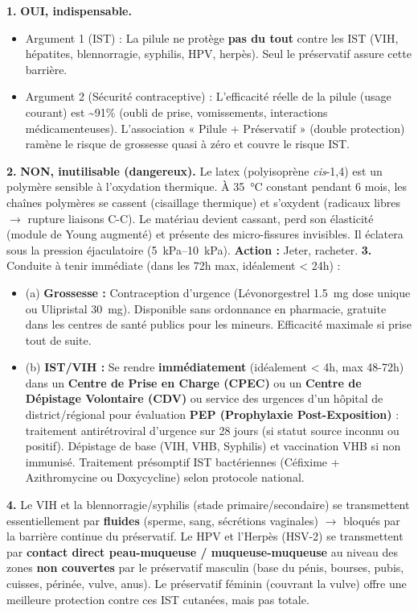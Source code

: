 \documentclass[11pt]{article}
\begin{document}
\begin{corrige}
\textbf{1.} \textbf{OUI, indispensable.}
    \begin{itemize}
        \item Argument 1 (IST) : La pilule ne protège \textbf{pas du tout} contre les IST (VIH, hépatites, blennorragie, syphilis, HPV, herpès). Seul le préservatif assure cette barrière.
        \item Argument 2 (Sécurité contraceptive) : L'efficacité réelle de la pilule (usage courant) est \textasciitilde 91\% (oubli de prise, vomissements, interactions médicamenteuses). L'association « Pilule + Préservatif » (double protection) ramène le risque de grossesse quasi à zéro et couvre le risque IST.
    \end{itemize}
\textbf{2.} \textbf{NON, inutilisable (dangereux).} Le latex (polyisoprène \textit{cis}-1,4) est un polymère sensible à l'oxydation thermique. À \SI{35}{\celsius} constant pendant 6 mois, les chaînes polymères se cassent (cisaillage thermique) et s'oxydent (radicaux libres $\rightarrow$ rupture liaisons C-C). Le matériau devient cassant, perd son élasticité (module de Young augmenté) et présente des micro-fissures invisibles. Il éclatera sous la pression éjaculatoire (\SIrange{5}{10}{\kilo\pascal}). \textbf{Action :} Jeter, racheter.
\textbf{3.} Conduite à tenir immédiate (dans les 72h max, idéalement < 24h) :
    \begin{itemize}
        \item (a) \textbf{Grossesse :} Contraception d'urgence (Lévonorgestrel \SI{1,5}{mg} dose unique ou Ulipristal \SI{30}{mg}). Disponible sans ordonnance en pharmacie, gratuite dans les centres de santé publics pour les mineurs. Efficacité maximale si prise tout de suite.
        \item (b) \textbf{IST/VIH :} Se rendre \textbf{immédiatement} (idéalement < 4h, max 48-72h) dans un \textbf{Centre de Prise en Charge (CPEC)} ou un \textbf{Centre de Dépistage Volontaire (CDV)} ou service des urgences d'un hôpital de district/régional pour évaluation \textbf{PEP (Prophylaxie Post-Exposition)} : traitement antirétroviral d'urgence sur 28 jours (si statut source inconnu ou positif). Dépistage de base (VIH, VHB, Syphilis) et vaccination VHB si non immunisé. Traitement présomptif IST bactériennes (Céfixime + Azithromycine ou Doxycycline) selon protocole national.
    \end{itemize}
\textbf{4.} Le VIH et la blennorragie/syphilis (stade primaire/secondaire) se transmettent essentiellement par \textbf{fluides} (sperme, sang, sécrétions vaginales) $\rightarrow$ bloqués par la barrière continue du préservatif. Le HPV et l'Herpès (HSV-2) se transmettent par \textbf{contact direct peau-muqueuse / muqueuse-muqueuse} au niveau des zones \textbf{non couvertes} par le préservatif masculin (base du pénis, bourses, pubis, cuisses, périnée, vulve, anus). Le préservatif féminin (couvrant la vulve) offre une meilleure protection contre ces IST cutanées, mais pas totale.
\end{corrige}
\end{document}
